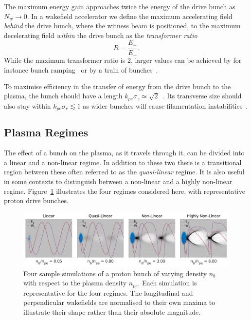 The maximum energy gain approaches twice the energy of the drive bunch as $N_{w} \to 0$.
In a wakefield accelerator we define the maximum accelerating field \textit{behind} the drive bunch, where the witness beam is positioned, to the maximum decelerating field \textit{within} the drive bunch as the \textit{transformer ratio}~\cite{muggli:2017}
\begin{equation}
    R = \frac{E_{+}}{E_{-}}. \label{EQ:TRat}
\end{equation}
While the maximum transformer ratio is $2$, larger values can be achieved by for instance bunch ramping~\cite{bane:1985} or by a train of bunches~\cite{jing:2006}.

To maximise efficiency in the transfer of energy from the drive bunch to the plasma, the bunch should have a length $k_{pe}\sigma_{z} \simeq \sqrt{2}$~\cite{lu:2005,lee:2000}.
Its transverse size should also stay within $k_{pe}\sigma_{r} \lesssim 1$ as wider bunches will cause filamentation instabilities~\cite{allen:2012,sentoku:2003}.

\subsection{Plasma Regimes}
\label{Int:BPI:Reg}

The effect of a bunch on the plasma, as it travels through it, can be divided into a linear and a non-linear regime.
In addition to these two there is a transitional region between these often referred to as the \textit{quasi-linear} regime.
It is also useful in some contexts to distinguish between a non-linear and a highly non-linear regime.
Figure~\ref{Fig:BPI:Regime} illustrates the four regimes considered here, with representative proton drive bunches.

\begin{figure}[hbt]
    \centering
    \includegraphics[width=1.0\linewidth]{figures/Regimes}
    \caption{\label{Fig:BPI:Regime}
        Four sample simulations of a proton bunch of varying density $n_{b}$ with respect to the plasma density $n_{pe}$.
        Each simulation is representative for the four regimes.
        The longitudinal and perpendicular wakefields are normalised to their own maxima to illustrate their shape rather than their absolute magnitude.
    }
\end{figure}


